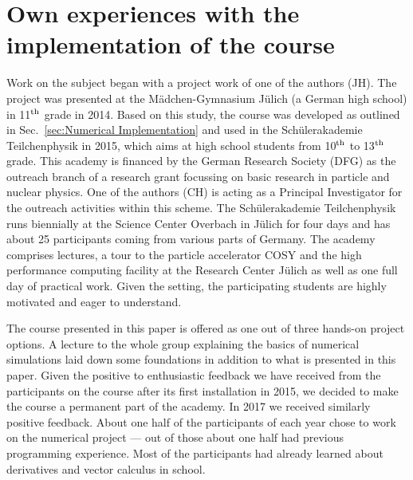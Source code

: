 \documentclass[12pt,ngerman,american]{iopart}
\begin{document}
\section{Own experiences with the implementation of the course}

Work on the subject began with a project work of one of the authors (JH).
The project was presented at the M\"adchen-Gymnasium J\"ulich (a German high school) in 11$^{\rm th}$ grade in 2014.
Based on this study, the course was developed as outlined in Sec.~\ref{sec:Numerical Implementation} and used in the Sch\"ulerakademie Teilchenphysik in 2015, which aims at high school students from 10$^{\rm th}$ to 13$^{\rm th}$ grade.
This academy is financed by the German Research Society (DFG) as the outreach branch of a research grant focussing on basic research in particle and nuclear physics.
One of the authors (CH) is acting as a Principal Investigator for the outreach activities within this scheme.
The Sch\"ulerakademie Teilchenphysik runs biennially at the Science Center Overbach in J\"ulich for four days and has about 25 participants coming from various parts of Germany.
The academy comprises lectures, a tour to the particle accelerator COSY and the high performance computing facility at the Research Center J\"ulich as well as one full day of practical work.
Given the setting, the participating students are highly motivated and eager to understand.

The course presented in this paper is offered as one out of three hands-on project options.
A lecture to the whole group explaining the basics of numerical simulations laid down some foundations in addition to what is presented in this paper.
Given the positive to enthusiastic feedback we have received from the participants on the course after its first installation in 2015, we decided to make the course a permanent part of the academy.
In 2017 we received similarly positive feedback.
About one half of the participants of each year chose to work on the numerical project --- out of those about one half had previous programming experience.
Most of the participants had already learned about derivatives and vector calculus in school.
\end{document}
